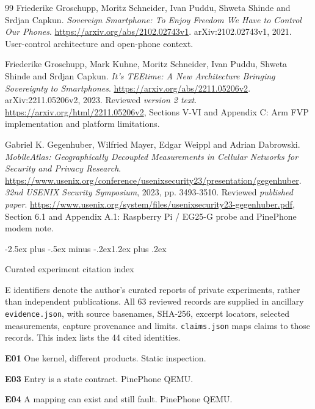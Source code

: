 \documentclass[10pt,letterpaper,twocolumn]{article}
\makeatletter
\renewcommand{\section}{\@startsection{section}{1}{0pt}
  {-2.5ex plus -.5ex minus -.2ex}{1.2ex plus .2ex}
  {\normalfont\large\bfseries\raggedright}}
\makeatother
\begin{document}
\begin{thebibliography}{99}
 Friederike Groschupp, Moritz Schneider, Ivan Puddu, Shweta Shinde and Srdjan Capkun. \emph{Sovereign Smartphone: To Enjoy Freedom We Have to Control Our Phones}. \url{https://arxiv.org/abs/2102.02743v1}. arXiv:2102.02743v1, 2021. User-control architecture and open-phone context.

 Friederike Groschupp, Mark Kuhne, Moritz Schneider, Ivan Puddu, Shweta Shinde and Srdjan Capkun. \emph{It's TEEtime: A New Architecture Bringing Sovereignty to Smartphones}. \url{https://arxiv.org/abs/2211.05206v2}. arXiv:2211.05206v2, 2023. Reviewed \emph{version 2 text}. \url{https://arxiv.org/html/2211.05206v2}, Sections V-VI and Appendix C: Arm FVP implementation and platform limitations.

 Gabriel K. Gegenhuber, Wilfried Mayer, Edgar Weippl and Adrian Dabrowski. \emph{MobileAtlas: Geographically Decoupled Measurements in Cellular Networks for Security and Privacy Research}. \url{https://www.usenix.org/conference/usenixsecurity23/presentation/gegenhuber}. \emph{32nd USENIX Security Symposium}, 2023, pp. 3493-3510. Reviewed \emph{published paper}. \url{https://www.usenix.org/system/files/usenixsecurity23-gegenhuber.pdf}, Section 6.1 and Appendix A.1: Raspberry Pi / EG25-G probe and PinePhone modem note.

\end{thebibliography}

\appendix

\section{Curated experiment citation index}

E identifiers denote the author's curated reports of private experiments, rather than independent publications. All 63 reviewed records are supplied in ancillary \texttt{evidence.json}, with source basenames, SHA-256, excerpt locators, selected measurements, capture provenance and limits. \texttt{claims.json} maps claims to those records. This index lists the 44 cited identities.

\setlength{\parskip}{2pt}

\noindent\hypertarget{e-E01}{\textbf{E01}} One kernel, different products. Static inspection.

\noindent\hypertarget{e-E03}{\textbf{E03}} Entry is a state contract. PinePhone QEMU.

\noindent\hypertarget{e-E04}{\textbf{E04}} A mapping can exist and still fault. PinePhone QEMU.
\end{document}
